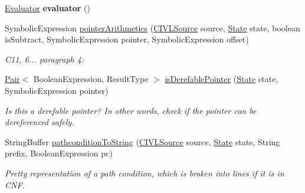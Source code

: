 \begin{DoxyCompactItemize}
\item 
\hypertarget{classedu_1_1udel_1_1cis_1_1vsl_1_1civl_1_1semantics_1_1common_1_1CommonSymbolicAnalyzer_a478821b377dd9f62dc3b3c5063bf101a}{}\hyperlink{interfaceedu_1_1udel_1_1cis_1_1vsl_1_1civl_1_1semantics_1_1IF_1_1Evaluator}{Evaluator} {\bfseries evaluator} ()\label{classedu_1_1udel_1_1cis_1_1vsl_1_1civl_1_1semantics_1_1common_1_1CommonSymbolicAnalyzer_a478821b377dd9f62dc3b3c5063bf101a}

\item 
Symbolic\+Expression \hyperlink{classedu_1_1udel_1_1cis_1_1vsl_1_1civl_1_1semantics_1_1common_1_1CommonSymbolicAnalyzer_acaddcb573248b57aa5b47b0d06bec95b}{pointer\+Arithmetics} (\hyperlink{interfaceedu_1_1udel_1_1cis_1_1vsl_1_1civl_1_1model_1_1IF_1_1CIVLSource}{C\+I\+V\+L\+Source} source, \hyperlink{interfaceedu_1_1udel_1_1cis_1_1vsl_1_1civl_1_1state_1_1IF_1_1State}{State} state, boolean is\+Subtract, Symbolic\+Expression pointer, Symbolic\+Expression offset)
\begin{DoxyCompactList}\small\item\em C11, 6... paragraph 4\+: \end{DoxyCompactList}\item 
\hyperlink{classedu_1_1udel_1_1cis_1_1vsl_1_1civl_1_1util_1_1IF_1_1Pair}{Pair}$<$ Boolean\+Expression, Result\+Type $>$ \hyperlink{classedu_1_1udel_1_1cis_1_1vsl_1_1civl_1_1semantics_1_1common_1_1CommonSymbolicAnalyzer_ae1ff2344d15fae6b3b47bad105fba93a}{is\+Derefable\+Pointer} (\hyperlink{interfaceedu_1_1udel_1_1cis_1_1vsl_1_1civl_1_1state_1_1IF_1_1State}{State} state, Symbolic\+Expression pointer)
\begin{DoxyCompactList}\small\item\em Is this a derefable pointer? In other words, check if the pointer can be dereferenced safely. \end{DoxyCompactList}\item 
String\+Buffer \hyperlink{classedu_1_1udel_1_1cis_1_1vsl_1_1civl_1_1semantics_1_1common_1_1CommonSymbolicAnalyzer_a4d9ea9eeb4fc3aef2d056902f16aa709}{pathcondition\+To\+String} (\hyperlink{interfaceedu_1_1udel_1_1cis_1_1vsl_1_1civl_1_1model_1_1IF_1_1CIVLSource}{C\+I\+V\+L\+Source} source, \hyperlink{interfaceedu_1_1udel_1_1cis_1_1vsl_1_1civl_1_1state_1_1IF_1_1State}{State} state, String prefix, Boolean\+Expression pc)
\begin{DoxyCompactList}\small\item\em Pretty representation of a path condition, which is broken into lines if it is in C\+N\+F. \end{DoxyCompactList}\item 

\end{DoxyCompactItemize}
